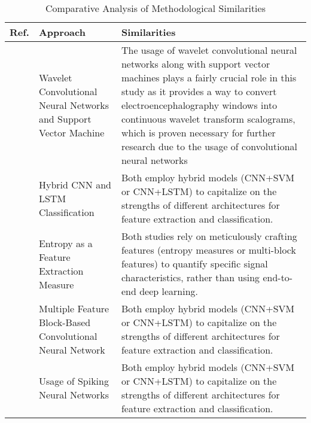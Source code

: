 \documentclass[conference]{IEEEtran}
\begin{document}
\begin{table}[htbp]
\centering
\scriptsize
\caption{Comparative Analysis of Methodological Similarities}
\label{tab:method_similarities}
\renewcommand{\arraystretch}{3}
\begin{tabular}{p{1.5cm}p{2.5cm}p{4.5cm}}
\hline
\textbf{Ref.} & \textbf{Approach} & \textbf{Similarities} \\
\hline
\textbf{\cite{b1}}
& Wavelet Convolutional Neural Networks and Support Vector Machine
& The usage of wavelet convolutional neural networks along with support vector machines plays a fairly crucial role in this study as it provides a way to convert electroencephalography windows into continuous wavelet transform scalograms, which is proven necessary for further research due to the usage of convolutional neural networks \\[1mm]
\textbf{\cite{b2}}
& Hybrid CNN and LSTM Classification
& Both employ hybrid models (CNN+SVM or CNN+LSTM) to capitalize on the strengths of different architectures for feature extraction and classification. \\[1mm]
\textbf{\cite{b3}}
& Entropy as a Feature Extraction Measure
& Both studies rely on meticulously crafting features (entropy measures or multi-block features) to quantify specific signal characteristics, rather than using end-to-end deep learning. \\[1mm]
\textbf{\cite{b4}}
& Multiple Feature Block-Based Convolutional Neural Network
& Both employ hybrid models (CNN+SVM or CNN+LSTM) to capitalize on the strengths of different architectures for feature extraction and classification. \\[1mm]
\textbf{\cite{b5}}
& Usage of Spiking Neural Networks
& Both employ hybrid models (CNN+SVM or CNN+LSTM) to capitalize on the strengths of different architectures for feature extraction and classification. \\[1mm]
\hline
\end{tabular}
\end{table}
\end{document}
